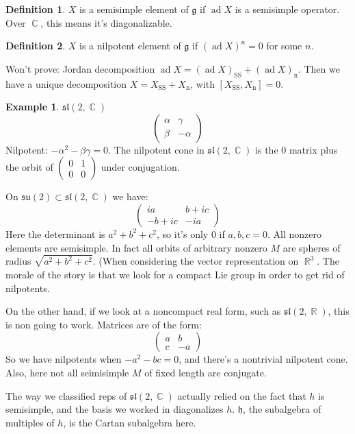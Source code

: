 \documentclass[12 pt]{article}
\DeclareMathOperator {\R} {\mathbb{R}}
\DeclareMathOperator {\C} {\mathbb{C}}
\DeclareMathOperator {\ad} {ad}
\theoremstyle{plain}
\theoremstyle{definition}
\newtheorem{defn}{Definition}
\newtheorem{exmp}{Example}
\theoremstyle{remark}
\begin{document}
\begin{defn}
$X$ is a semisimple element of $\mathfrak{g}$ if $\ad X$ is a semisimple operator. Over $\C$, this means it's diagonalizable. 
\end{defn}
\begin{defn}
$X$ is a nilpotent element of $\mathfrak{g}$ if $(\ad X)^n = 0$ for some $n$.
\end{defn}
Won't prove: Jordan decomposition $\ad X = (\ad X)_{\text{SS}} + (\ad X)_{\text{n}}$. Then we have a unique decomposition $X = X_{\text{SS}} + X_{\text{n}}$, with $[X_{\text{SS}}, X_{\text{n}}] = 0$.
\begin{exmp} $\mathfrak{sl}(2,\C)$
\[    \left( \begin{array} {cc} \alpha & \gamma \\ \beta & - \alpha \end{array} \right)     \]
Nilpotent: $- \alpha^2 - \beta \gamma = 0$. The nilpotent cone in $\mathfrak{sl}(2,\C)$ is the $0$ matrix plus the orbit of $\left( \begin{array} {cc} 0 & 1 \\ 0 &0 \end{array} \right)$ under conjugation.

On $\mathfrak{su}(2) \subset \mathfrak{sl}(2,\C)$ we have:
\[   \left( \begin{array} {cc} ia & b+ic \\ -b+ic & - ia \end{array} \right)  \]
Here the determinant is $a^2 + b^2 + c^2$, so it's only 0 if $a,b,c=0$. All nonzero elements are semisimple. In fact all orbits of arbitrary nonzero $M$ are spheres of radius $\sqrt{a^2 + b^2 + c^2}$. (When considering the vector representation on $\R^3$. The morale of the story is that we look for a compact Lie group in order to get rid of nilpotents.

On the other hand, if we look at a noncompact real form, such as $\mathfrak{sl}(2,\R)$, this is non going to work. Matrices are of the form:
\[ \left( \begin{array} {cc} a & b \\ c & - a \end{array} \right) \]
So we have nilpotents when $-a^2 - bc = 0$, and there's a nontrivial nilpotent cone. Also, here not all seimisimple $M$ of fixed length are conjugate.
\end{exmp}
The way we classified reps of $\mathfrak{sl}(2,\C)$ actually relied on the fact that $h$ is semisimple, and the basis we worked in diagonalizes $h$. $\mathfrak{h}$, the subalgebra of multiples of $h$, is the Cartan subalgebra here.
\end{document}
